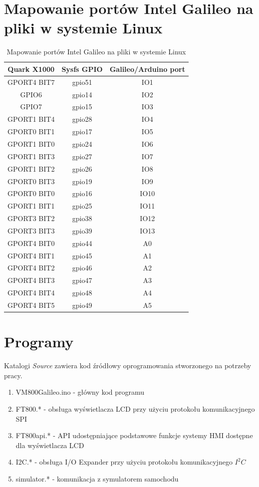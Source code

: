 \documentclass{xmgr}
\begin{document}
\chapter{Mapowanie portów Intel Galileo na pliki w systemie Linux}
\begin{table}[!hp]
\begin{tabular}{|c|c|c|} \hline
\textbf{Quark X1000} & \textbf{Sysfs GPIO} & \textbf{Galileo/Arduino port} \\ \hline
GPORT4 BIT7 & gpio51 & IO1 \\ \hline
GPIO6 & gpio14 & IO2 \\ \hline
GPIO7 & gpio15 & IO3 \\ \hline
GPORT1 BIT4 & gpio28 & IO4 \\ \hline
GPORT0 BIT1 & gpio17 & IO5 \\ \hline
GPORT1 BIT0 & gpio24 & IO6 \\ \hline
GPORT1 BIT3 & gpio27 & IO7 \\ \hline
GPORT1 BIT2 & gpio26 & IO8 \\ \hline
GPORT0 BIT3 & gpio19 & IO9 \\ \hline
GPORT0 BIT0 & gpio16 & IO10 \\ \hline
GPORT1 BIT1 & gpio25 & IO11 \\ \hline
GPORT3 BIT2 & gpio38 & IO12 \\ \hline
GPORT3 BIT3 & gpio39 & IO13 \\ \hline
GPORT4 BIT0 & gpio44 & A0 \\ \hline
GPORT4 BIT1 & gpio45 & A1 \\ \hline
GPORT4 BIT2 & gpio46 & A2 \\ \hline
GPORT4 BIT3 & gpio47 & A3 \\ \hline
GPORT4 BIT4 & gpio48 & A4 \\ \hline
GPORT4 BIT5 & gpio49 & A5 \\ \hline
\end{tabular}
\caption{Mapowanie portów Intel Galileo na pliki w systemie Linux}
\end{table}

\chapter{Programy}
Katalogi \emph{Source} zawiera kod źródłowy oprogramowania stworzonego na potrzeby pracy. 
\begin{enumerate} 
	\item VM800Galileo.ino - główny kod programu
	\item FT800.* - obsługa wyświetlacza LCD przy użyciu protokołu komunikacyjnego SPI
	\item FT800api.* - API udostępniające podstawowe funkcje systemy HMI dostępne dla wyświetlacza LCD
	\item I2C.* - obsługa I/O Expander przy użyciu protokołu komunikacyjnego $I^2C$
	\item simulator.* - komunikacja z symulatorem samochodu
\end{enumerate}





\listoftables

\listoffigures

\oswiadczenie
\end{document}
